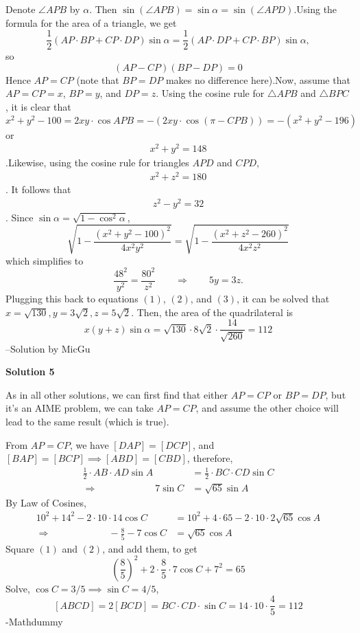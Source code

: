 \begin{enumerate}
Denote $\angle APB$ by $\alpha$. Then $\sin(\angle APB)=\sin \alpha = \sin(\angle APD)$.Using the formula for the area of a triangle, we get 
 \[\frac{1}{2} (AP\cdot BP+ CP\cdot DP)\sin\alpha=\frac{1}{2}(AP\cdot DP+ CP\cdot BP)\sin\alpha ,\] so 
 \[(AP-CP)(BP-DP)=0\]Hence $AP=CP$ (note that $BP=DP$ makes no difference here).Now, assume that $AP=CP=x$, $BP=y$, and $DP=z$. Using the cosine rule for $\triangle APB$ and $\triangle BPC$, it is clear that 
 \[x^2+y^2-100=2 xy \cdot \cos{APB}=-(2 xy \cdot \cos{(\pi-CPB)})=-(x^2+y^2-196)\] or 
 \begin{align}x^2+y^2=148\end{align}.Likewise, using the cosine rule for triangles $APD$ and $CPD$, 
 \begin{align}\tag{2}x^2+z^2=180\end{align}. It follows that 
 \begin{align}\tag{3}z^2-y^2=32\end{align}. Since $\sin\alpha=\sqrt{1-\cos^2\alpha}$, 
 \[\sqrt{1-\frac{(x^2+y^2-100)^2}{4x^2y^2}}=\sqrt{1-\frac{(x^2+z^2-260)^2}{4x^2z^2}}\] which simplifies to 
 \[\frac{48^2}{y^2}=\frac{80^2}{z^2} \qquad \Longrightarrow \qquad 5y=3z.\] Plugging this back to equations $(1)$, $(2)$, and $(3)$, it can be solved that $x=\sqrt{130},y=3\sqrt{2},z=5\sqrt{2}$. Then, the area of the quadrilateral is 
 \[x(y+z)\sin\alpha=\sqrt{130}\cdot8\sqrt{2}\cdot\frac{14}{\sqrt{260}}=\boxed{112}\]--Solution by MicGu

 



\textbf{Solution 5}

As in all other solutions, we can first find that either $AP=CP$ or $BP=DP$, but it's an AIME problem, we can take $AP=CP$, and assume the other choice will lead to the same result (which is true). 

 From $AP=CP$, we have $[DAP]=[DCP]$, and $[BAP]=[BCP] \implies [ABD] = [CBD]$, therefore,
 \begin{align} \nonumber \frac 12 \cdot AB\cdot AD\sin A &= \frac 12 \cdot BC\cdot CD\sin C \\ \Longrightarrow \hspace{1in} 7\sin C &= \sqrt{65}\sin A  \end{align}By Law of Cosines,
 \begin{align} \nonumber 10^2+14^2-2\cdot 10\cdot 14\cos C &= 10^2+4\cdot 65-2\cdot 10\cdot 2\sqrt{65}\cos A \\ \Longrightarrow \hspace{1in} -\frac 85 - 7\cos C &=  \sqrt{65}\cos A \tag{2} \end{align}Square $(1)$ and $(2)$, and add them, to get
 \[\left(\frac 85\right)^2  + 2\cdot \frac 85 \cdot 7\cos C + 7^2 = 65\]Solve, $\cos C = 3/5  \implies \sin C = 4/5$,
 \[[ABCD] = 2[BCD] = BC\cdot CD\cdot \sin C = 14\cdot 10\cdot \frac 45 = \boxed{112}\]-Mathdummy


\end{enumerate}

